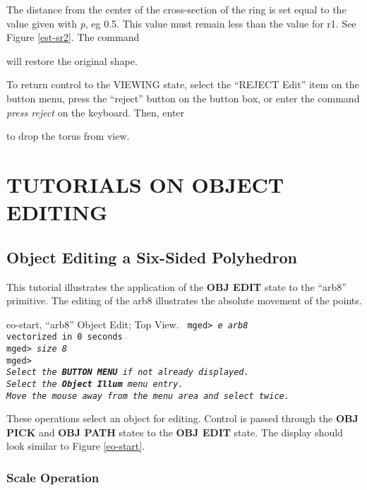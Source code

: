 The distance from the center of the cross-section of the ring is set equal
to the value given with {\em p}, eg 0.5.
This value must remain less than the value for r1.
See Figure \ref{est-sr2}.
The command


will restore the original shape.

To return control to the VIEWING state, select the ``REJECT Edit''
item on the button menu, press the ``reject'' button on the button box,
or enter the command {\em press reject} on the keyboard.
Then, enter


to drop the torus from view.
\chapter{TUTORIALS ON OBJECT EDITING}

\section{Object Editing a Six-Sided Polyhedron}

This tutorial illustrates the application of the {\bf OBJ EDIT} state to
the ``arb8'' primitive.  The editing of the arb8 illustrates the
absolute movement of the points.

\mfig eo-start, ``arb8'' Object Edit; Top View.
\noindent
{\tt
mged> {\em e arb8}\\
vectorized in 0 seconds\\
mged> {\em size 8}\\
mged>\\
{\em Select the {\bf BUTTON MENU} if not already displayed.} \\
{\em Select the {\bf Object Illum} menu entry.} \\
{\em Move the mouse away from the menu area and select twice.} \\
}

These operations select an object for editing.
Control is passed through the {\bf OBJ PICK} and {\bf OBJ PATH} states
to the {\bf OBJ EDIT} state.  The display should look similar to
Figure \ref{eo-start}.

\subsection{Scale Operation}

